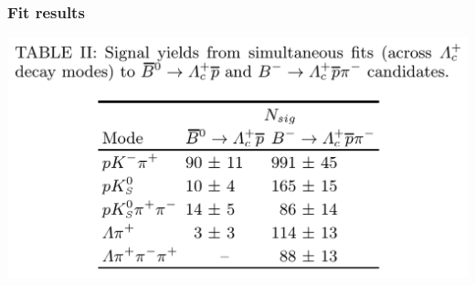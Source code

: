 \documentclass[10pt, aspectratio=169]{beamer}
\begin{document}
\begin{frame}[label=fit]
{  }
\end{frame}%

\begin{frame}[label=fit-table]%
  \frametitle{Fit results}
  \centering

  \includegraphics[width=.8\textwidth]{figures/002/table-yields}
\end{frame}%
\end{document}
